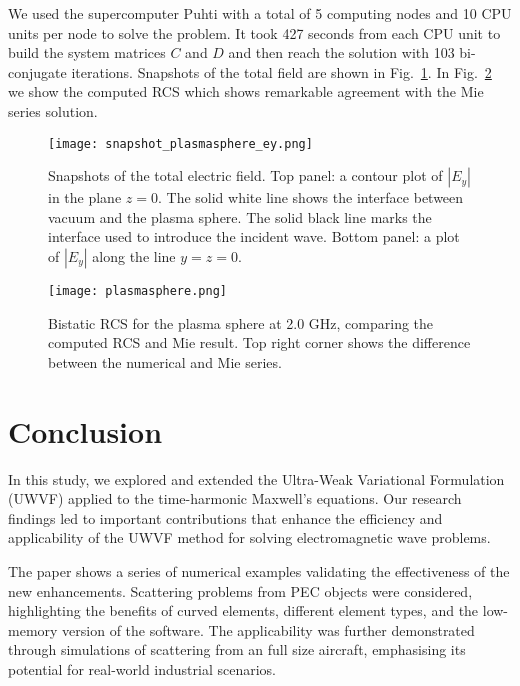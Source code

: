\documentclass[a4paper,12pt]{article}
\begin{document}
We used the supercomputer Puhti with a total of 5 computing nodes and 10 CPU units per node to solve the problem. It took 427 seconds from each CPU unit to build the system matrices $C$ and $D$ and then reach the solution with 103 bi-conjugate iterations. Snapshots of the total field are shown in Fig.~\ref{fig:plasma_sphere_snap}.  In Fig.~\ref{fig:plasma_sphere_mie} we show the computed RCS which shows remarkable agreement with the Mie series solution.

\begin{figure}[!htb]
    \centering
    \texttt{[image: snapshot\_plasmasphere\_ey.png]}
    \caption{Snapshots of the total electric field. Top panel: a contour plot of $|E_y|$ in the plane $z=0$. The solid white line shows the interface between vacuum and the plasma sphere. The solid black line marks the interface used to introduce the incident wave. Bottom panel: a plot of $|E_y|$ along the line $y=z=0$.}
    \label{fig:plasma_sphere_snap}
\end{figure}

\begin{figure}[!htb]
    \centering
    \texttt{[image: plasmasphere.png]} 
\caption{Bistatic RCS for the plasma sphere at 2.0 GHz, comparing the computed RCS and Mie result. Top right corner shows the difference between the numerical and Mie series.}
    \label{fig:plasma_sphere_mie}
\end{figure}



\section{Conclusion}\label{sec:conc}

In this study, we explored and extended the Ultra-Weak Variational Formulation (UWVF) applied to the time-harmonic Maxwell's equations. Our research findings led to important contributions that enhance the efficiency and applicability of the UWVF method for solving electromagnetic wave problems.

The paper shows a series of numerical examples validating the effectiveness of the new enhancements. Scattering problems from PEC objects were considered, highlighting the benefits of curved elements, different element types, and the low-memory version of the software. The applicability was further demonstrated through simulations of scattering from an full size aircraft, emphasising its potential for real-world industrial scenarios.
\end{document}
